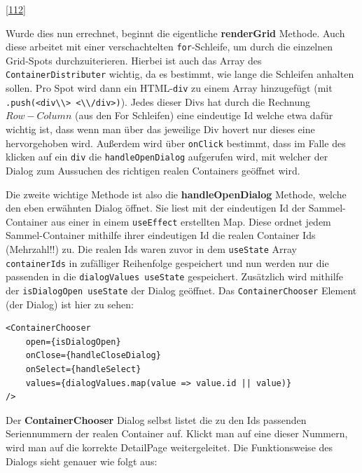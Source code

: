 \documentclass[
    headings=optiontotocandhead,%
    twoside,
    numbers=noenddot,%
    12pt, %
    titlepage, %
    parskip=full, %
    listof=leveldown, 
    numbers=noenddot, %
    a4paper,DIV=14,
    BCOR=15mm,
]{scrbook}
\newcommand{\passthrough}[1]{#1}
\begin{document}
{[}\protect\hyperlink{ref-gpt-ContainerDistributorScript}{112}{]}

Wurde dies nun errechnet, beginnt die eigentliche \textbf{renderGrid}
Methode. Auch diese arbeitet mit einer verschachtelten
\passthrough{\lstinline!for!}-Schleife, um durch die einzelnen
Grid-Spots durchzuiterieren. Hierbei ist auch das Array des
\passthrough{\lstinline!ContainerDistributer!} wichtig, da es bestimmt,
wie lange die Schleifen anhalten sollen. Pro Spot wird dann ein
HTML-\passthrough{\lstinline!div!} zu einem Array hinzugefügt (mit
\passthrough{\lstinline!.push(<div\\> <\\/div>)!}). Jedes dieser Divs
hat durch die Rechnung \(Row - Column\) (aus den For Schleifen) eine
eindeutige Id welche etwa dafür wichtig ist, dass wenn man über das
jeweilige Div hovert nur dieses eine hervorgehoben wird. Außerdem wird
über \passthrough{\lstinline!onClick!} bestimmt, dass im Falle des
klicken auf ein \passthrough{\lstinline!div!} die
\passthrough{\lstinline!handleOpenDialog!} aufgerufen wird, mit welcher
der Dialog zum Aussuchen des richtigen realen Containers geöffnet wird.

Die zweite wichtige Methode ist also die \textbf{handleOpenDialog}
Methode, welche den eben erwähnten Dialog öffnet. Sie liest mit der
eindeutigen Id der Sammel-Container aus einer in einem
\passthrough{\lstinline!useEffect!} erstellten Map. Diese ordnet jedem
Sammel-Container mithilfe ihrer eindeutigen Id die realen Container Ids
(Mehrzahl!!) zu. Die realen Ids waren zuvor in dem
\passthrough{\lstinline!useState!} Array
\passthrough{\lstinline!containerIds!} in zufälliger Reihenfolge
gespeichert und nun werden nur die passenden in die
\passthrough{\lstinline!dialogValues useState!} gespeichert. Zusätzlich
wird mithilfe der \passthrough{\lstinline!isDialogOpen useState!} der
Dialog geöffnet. Das \passthrough{\lstinline!ContainerChooser!} Element
(der Dialog) ist hier zu sehen:

\begin{lstlisting}[caption={ContainerChooser Komponente Nutzung}]
<ContainerChooser
    open={isDialogOpen}
    onClose={handleCloseDialog}
    onSelect={handleSelect}
    values={dialogValues.map(value => value.id || value)}
/>
\end{lstlisting}

Der \textbf{ContainerChooser} Dialog selbst listet die zu den Ids
passenden Seriennummern der realen Container auf. Klickt man auf eine
dieser Nummern, wird man auf die korrekte DetailPage weitergeleitet. Die
Funktionsweise des Dialogs sieht genauer wie folgt aus:
\end{document}
